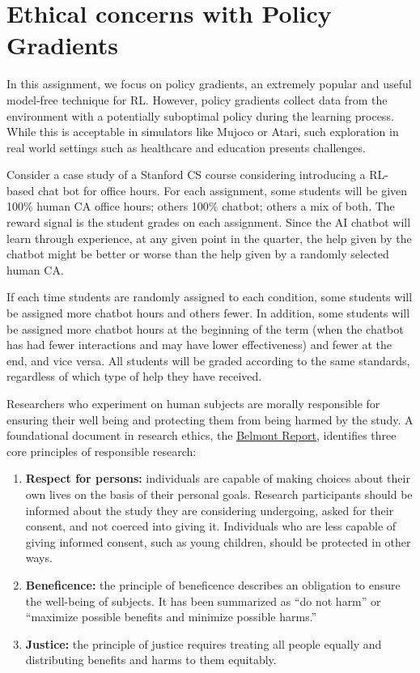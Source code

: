 \section{Ethical concerns with Policy Gradients}

In this assignment, we focus on policy gradients, an extremely popular and useful model-free technique for RL. However, policy gradients collect data from the environment with a potentially suboptimal policy during the learning process. While this is acceptable in simulators like Mujoco or Atari, such exploration in real world settings such as healthcare and education presents challenges. 

Consider a case study of a Stanford CS course considering introducing a RL-based chat bot for office hours.  For each assignment, some students will be given 100\% human CA office hours; others 100\% chatbot; others a mix of both. The reward signal is the student grades on each assignment. Since the AI chatbot will learn through experience, at any given point in the quarter, the help given by the chatbot might be better or worse than the help given by a randomly selected human CA.  

If each time students are randomly assigned to each condition, some students will be assigned more chatbot hours and others fewer. In addition, some students will be assigned more chatbot hours at the beginning of the term (when the chatbot has had fewer interactions and may have lower effectiveness)  and fewer at the end, and vice versa.  All students will be graded according to the same standards, regardless of which type of help they have received.  

Researchers who experiment on human subjects are morally responsible for ensuring their well being and protecting them from being harmed by the study. A foundational document in research ethics, the \href{https://www.hhs.gov/ohrp/regulations-and-policy/belmont-report/read-the-belmont-report/index.html#xethical}{Belmont Report}, identifies three core principles of responsible research:

\begin{enumerate}
    \item \textbf{Respect for persons:} individuals are capable of making choices about their own lives on the basis of their personal goals. Research participants should be informed about the study they are considering undergoing, asked for their consent, and not coerced into giving it. Individuals who are less capable of giving informed consent, such as young children, should be protected in other ways.
    \item \textbf{Beneficence:} the principle of beneficence describes an obligation to ensure the well-being of subjects. It has been summarized as “do not harm” or “maximize possible benefits and minimize possible harms.”
    \item \textbf{Justice:} the principle of justice requires treating all people equally and distributing benefits and harms to them equitably. 
\end{enumerate}

\begin{enumerate}[(a)]

    

\end{enumerate}